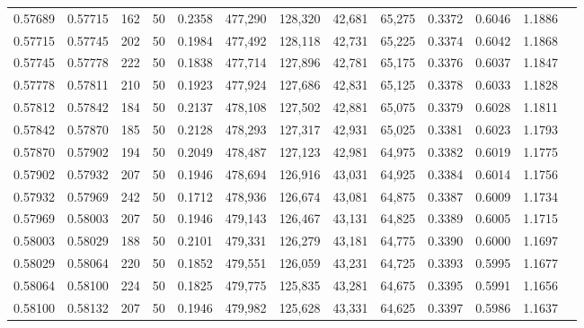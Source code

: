 \begin{tabular}{rrrrrrrrrrrrr}
0.57689 & 0.57715 &   162 &  50 &                                     0.2358 & 477,290 & 128,320 &  42,681 &  65,275 & 0.3372 & 0.6046 & 1.1886 \\
0.57715 & 0.57745 &   202 &  50 &                                     0.1984 & 477,492 & 128,118 &  42,731 &  65,225 & 0.3374 & 0.6042 & 1.1868 \\
0.57745 & 0.57778 &   222 &  50 &                                     0.1838 & 477,714 & 127,896 &  42,781 &  65,175 & 0.3376 & 0.6037 & 1.1847 \\
0.57778 & 0.57811 &   210 &  50 &                                     0.1923 & 477,924 & 127,686 &  42,831 &  65,125 & 0.3378 & 0.6033 & 1.1828 \\
0.57812 & 0.57842 &   184 &  50 &                                     0.2137 & 478,108 & 127,502 &  42,881 &  65,075 & 0.3379 & 0.6028 & 1.1811 \\
0.57842 & 0.57870 &   185 &  50 &                                     0.2128 & 478,293 & 127,317 &  42,931 &  65,025 & 0.3381 & 0.6023 & 1.1793 \\
0.57870 & 0.57902 &   194 &  50 &                                     0.2049 & 478,487 & 127,123 &  42,981 &  64,975 & 0.3382 & 0.6019 & 1.1775 \\
0.57902 & 0.57932 &   207 &  50 &                                     0.1946 & 478,694 & 126,916 &  43,031 &  64,925 & 0.3384 & 0.6014 & 1.1756 \\
0.57932 & 0.57969 &   242 &  50 &                                     0.1712 & 478,936 & 126,674 &  43,081 &  64,875 & 0.3387 & 0.6009 & 1.1734 \\
0.57969 & 0.58003 &   207 &  50 &                                     0.1946 & 479,143 & 126,467 &  43,131 &  64,825 & 0.3389 & 0.6005 & 1.1715 \\
0.58003 & 0.58029 &   188 &  50 &                                     0.2101 & 479,331 & 126,279 &  43,181 &  64,775 & 0.3390 & 0.6000 & 1.1697 \\
0.58029 & 0.58064 &   220 &  50 &                                     0.1852 & 479,551 & 126,059 &  43,231 &  64,725 & 0.3393 & 0.5995 & 1.1677 \\
0.58064 & 0.58100 &   224 &  50 &                                     0.1825 & 479,775 & 125,835 &  43,281 &  64,675 & 0.3395 & 0.5991 & 1.1656 \\
0.58100 & 0.58132 &   207 &  50 &                                     0.1946 & 479,982 & 125,628 &  43,331 &  64,625 & 0.3397 & 0.5986 & 1.1637 \\

\end{tabular}
